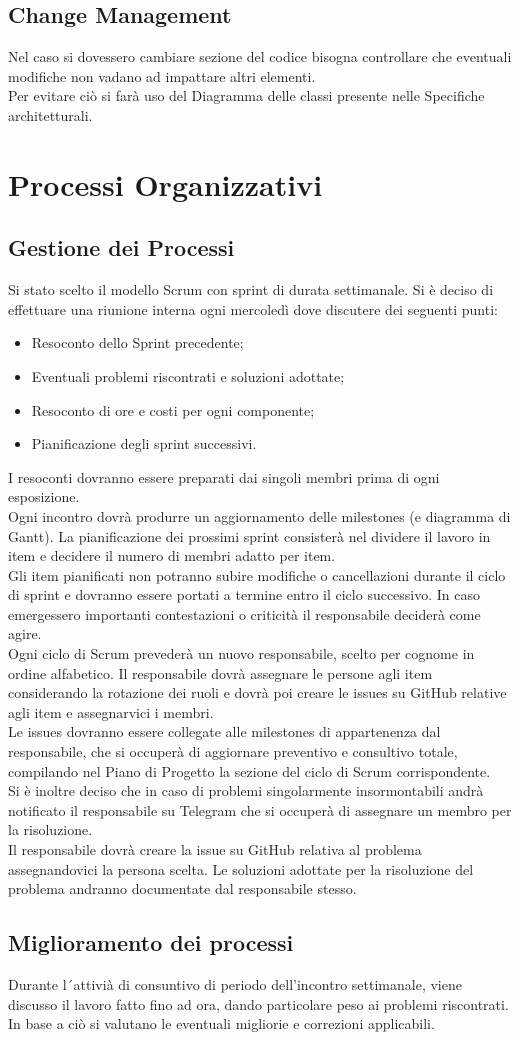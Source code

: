 \documentclass[a4paper, 12pt]{article}
\begin{document}
\subsection{Change Management}
Nel caso si dovessero cambiare sezione del codice bisogna controllare che eventuali modifiche
non vadano ad impattare altri elementi.\\
Per evitare ciò si farà uso del Diagramma delle classi presente nelle Specifiche architetturali.
\newpage
\section{Processi Organizzativi}
\subsection{Gestione dei Processi}
Si stato scelto il modello Scrum con sprint di durata settimanale. Si è deciso di effettuare una riunione interna ogni mercoledì dove discutere dei seguenti punti:
\begin{itemize}
    \item Resoconto dello Sprint precedente;
    \item Eventuali problemi riscontrati e soluzioni adottate;
    \item Resoconto di ore e costi per ogni componente;
    \item Pianificazione degli sprint successivi.
\end{itemize}
I resoconti dovranno essere preparati dai singoli membri prima di ogni esposizione.\\ Ogni incontro dovrà produrre un aggiornamento delle milestones (e diagramma di Gantt). La pianificazione dei prossimi sprint consisterà nel dividere il lavoro in item e decidere il
numero di membri adatto per item. \\
Gli item pianificati non potranno subire modifiche o cancellazioni durante il ciclo di sprint e dovranno essere portati a termine entro il ciclo successivo.
In caso emergessero importanti contestazioni o criticità il responsabile deciderà
come agire.\\
Ogni ciclo di Scrum prevederà un nuovo responsabile, scelto per cognome in ordine alfabetico. Il responsabile dovrà assegnare le persone agli item considerando la
rotazione dei ruoli e dovrà poi creare le issues su GitHub relative agli item
e assegnarvici i membri. \\
Le issues dovranno essere collegate alle milestones di appartenenza
dal responsabile, che si occuperà di aggiornare preventivo e consultivo
totale, compilando nel Piano di Progetto la sezione del ciclo di Scrum corrispondente. \\
Si è inoltre deciso che in caso di problemi singolarmente insormontabili andrà notificato
il responsabile su Telegram che si occuperà di assegnare un membro per la risoluzione. \\
Il responsabile dovrà creare la issue su GitHub relativa al problema assegnandovici la persona
scelta. Le soluzioni adottate per la risoluzione del problema andranno documentate
dal responsabile stesso.
\subsection{Miglioramento dei processi}
Durante l´attivià di consuntivo di periodo dell’incontro settimanale, viene discusso il lavoro
fatto fino ad ora, dando particolare peso ai problemi riscontrati. \\In base a ciò si valutano
le eventuali migliorie e correzioni applicabili.
\end{document}
